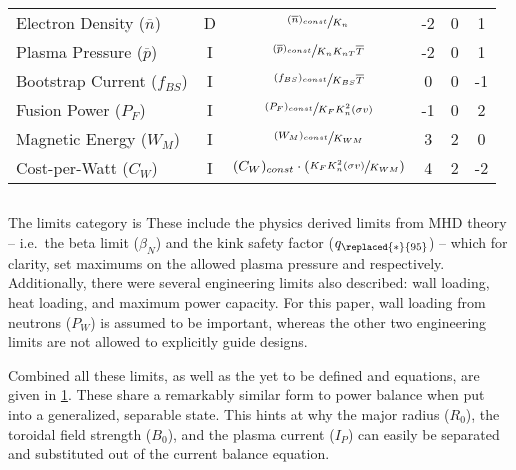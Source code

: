 \begin{table}[hb!]
\begin{spacing}{1.5}
\begin{tabular}{lccccc}
Electron Density ($\overline n$) & D & $\sfrac{ (\overline n)_{const} }{ K_n }$ & -2 & 0 & 1 \\
Plasma Pressure ($\overline p$) & I & $\sfrac{ (\overline p)_{const} }{ K_n K_{nT} \overline T }$ & -2 & 0 & 1 
\\
Bootstrap Current ($f_{BS}$) & I & $\sfrac{ ( f_{BS} )_{const} }{ K_{BS} \overline T }$ & 0 & 0 & -1 \\
Fusion Power ($P_F$) & I & $\sfrac{ (P_F)_{const} }{ K_F K_n ^ 2 ( \sigma v ) }$ & -1 & 0 & 2 \\
Magnetic Energy ($W_M$) & I & $\sfrac{ (W_M)_{const} }{ K_{WM} }$ & 3 & 2 & 0 \\
Cost-per-Watt ($C_W$) & I & $ (C_W)_{const} \cdot \left( \sfrac{ K_F K_n ^ 2 ( \sigma v ) }{ K_{WM} } \right)$ & 4 & 2 & -2 \\
\end{tabular}
\end{spacing}
\label{table:eq}
\end{table}

\subsection{}

The limits category is  These include the physics derived limits from MHD theory -- i.e.\ the beta limit ($\beta_N$) and the kink safety factor ($q_{\replaced{*}{95}}$) -- which for clarity, set maximums on the allowed plasma pressure and  respectively. Additionally, there were several engineering limits also described: wall loading, heat loading, and maximum power capacity. For this paper, wall loading from neutrons ($P_W$) is assumed to be important, whereas the other two engineering limits are not allowed to explicitly guide designs.

Combined all these limits, as well as the yet to be defined  and  equations, are given in \cref{table:eq}. These share a remarkably similar form to power balance when put into a generalized, separable state. This hints at why the major radius ($R_0$), the toroidal field strength ($B_0$), and the plasma current ($I_P$) can easily be separated and substituted out of the current balance equation.

